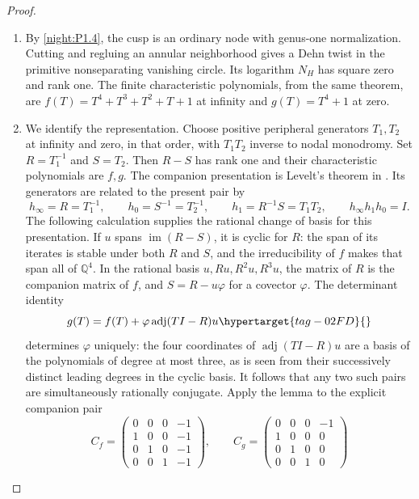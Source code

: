 \documentclass[11pt,a4paper]{article}
\numberwithin{equation}{section}
\theoremstyle{definition}
\begin{document}
\begin{proof}
\begin{enumerate}[label=\arabic*.]
\item By \cref{night:P1.4}, the cusp is an ordinary node with
genus-one normalization. Cutting and regluing an annular neighborhood
gives a Dehn twist in the primitive nonseparating vanishing circle.
Its logarithm $N_H$ has square zero and rank one.
The finite characteristic polynomials, from the same theorem, are
$f(T)=T^4+T^3+T^2+T+1$ at infinity and $g(T)=T^4+1$ at zero.

\item We identify the representation.
Choose positive peripheral generators $T_1,T_2$ at infinity and
zero, in that order, with $T_1T_2$ inverse to nodal monodromy.
Set $R=T_1^{-1}$ and $S=T_2$.  Then $R-S$ has rank one and their
characteristic polynomials are $f,g$.  The companion presentation
is Levelt's theorem in \cite[Theorem 3.5, pp.~331--332;
Corollary 3.6, p.~332]{BeukersHeckman1989}.  Its generators are
related to the present pair by
\[
 h_\infty=R=T_1^{-1},\qquad h_0=S^{-1}=T_2^{-1},\qquad
 h_1=R^{-1}S=T_1T_2,\qquad h_\infty h_1h_0=I.
\]
The following calculation supplies the rational change
of basis for this presentation.
If $u$ spans $\operatorname{im}(R-S)$, it is cyclic for $R$:
the span of its iterates is stable under both $R$ and $S$, and
the irreducibility of $f$ makes that span all of $\mathbb Q^4$.
In the rational basis $u,Ru,R^2u,R^3u$, the matrix of $R$ is
the companion matrix of $f$, and $S=R-u\varphi$ for a covector
$\varphi$.  The determinant identity
\begin{equation}
 g(T)=f(T)+\varphi\operatorname{adj}(TI-R)u
 \hypertarget{tag-02FD}{}\label{maps:eq:F.9}
\end{equation}
determines $\varphi$ uniquely: the four coordinates of
$\operatorname{adj}(TI-R)u$ are a basis of the polynomials of
degree at most three, as is seen from their successively distinct
leading degrees in the cyclic basis.  It follows that any two
such pairs are simultaneously rationally conjugate.  Apply the
lemma to the explicit companion pair
\begin{equation}
 C_f=\begin{pmatrix}
 0&0&0&-1\\1&0&0&-1\\0&1&0&-1\\0&0&1&-1
 \end{pmatrix},\qquad
 C_g=\begin{pmatrix}
 0&0&0&-1\\1&0&0&0\\0&1&0&0\\0&0&1&0

\end{pmatrix}
\end{equation}
\end{enumerate}
\end{proof}
\end{document}

